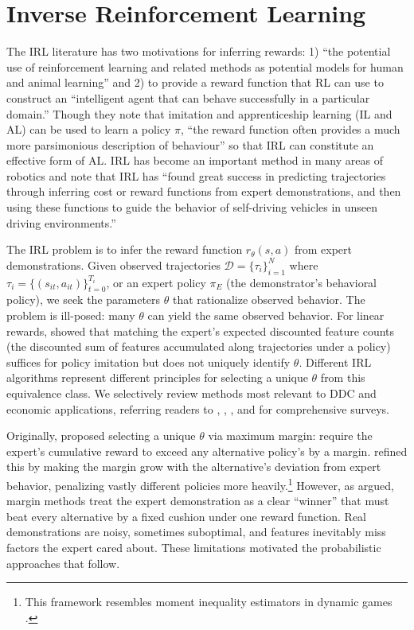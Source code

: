 
\section{Inverse Reinforcement Learning\label{sec:irl}}

The IRL literature \citep{ng:2000} has two motivations for inferring rewards: 1) ``the potential use of reinforcement learning and
related methods as potential models for human and animal learning'' and 2) to provide a reward function
that RL can use to construct an ``intelligent agent that can behave successfully in a particular domain.'' Though
they note that imitation and apprenticeship learning (IL and AL) can be used to learn a policy $\pi$, ``the reward
function often provides a much more parsimonious description of behaviour'' so that IRL can constitute an effective
form of AL. IRL has become an important method in many areas of robotics and \citet{av:2025} note that IRL has ``found great success in predicting 
trajectories through inferring cost or reward functions from expert demonstrations, 
and then using these functions to guide the behavior of self-driving vehicles in unseen driving environments.''

The IRL problem \citep{ng:2000} is to infer the reward function $r_\theta(s,a)$ from expert demonstrations. Given observed trajectories $\mathcal{D}=\{\tau_i\}_{i=1}^N$ where $\tau_i=\{(s_{it},a_{it})\}_{t=0}^{T_i}$, or an expert policy $\pi_E$ (the demonstrator's behavioral policy), we seek the parameters $\theta$ that rationalize observed behavior. The problem is ill-posed: many $\theta$ can yield the same observed behavior. For linear rewards, \citet{abbeel:2004} showed that matching the expert's expected discounted feature counts (the discounted sum of features accumulated along trajectories under a policy) suffices for policy imitation but does not uniquely identify $\theta$. Different IRL algorithms represent different principles for selecting a unique $\theta$ from this equivalence class. We selectively review methods most relevant to DDC and economic applications, referring readers to \citet{azar:2020}, \citet{arora:2021}, \citet{gleave:2022}, and \citet{adams:2022} for comprehensive surveys.

Originally, \citet{ng:2000} proposed selecting a unique $\theta$ via maximum margin: require the expert's cumulative reward to exceed any alternative policy's by a margin. \citet{ratliff:2006} refined this by making the margin grow with the alternative's deviation from expert behavior, penalizing vastly different policies more heavily.\footnote{\footnotesize This framework resembles moment inequality estimators in dynamic games \citep{bbl:2007}.} However, as \citet{ziebart:2010} argued, margin methods treat the expert demonstration as a clear ``winner'' that must beat every alternative by a fixed cushion under one reward function. Real demonstrations are noisy, sometimes suboptimal, and features inevitably miss factors the expert cared about. These limitations motivated the probabilistic approaches that follow.

